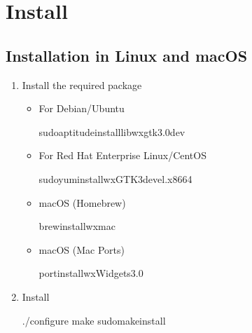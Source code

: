 \documentclass[letterpaper,10pt,pdftex,openany,english]{sphinxmanual}
\begin{document}
\sphinxstepscope


\chapter{Install}
\label{\detokenize{install:install}}\label{\detokenize{install::doc}}

\section{Installation in Linux and macOS}
\label{\detokenize{install:installation-in-linux-and-macos}}\begin{enumerate}
%
\item {} 
\sphinxAtStartPar
Install the required package
\begin{itemize}
\item {} 
\sphinxAtStartPar
For Debian/Ubuntu

\begin{sphinxVerbatim}[commandchars=\\\{\}]
\PYGZdl{}sudoaptitudeinstalllibwxgtk3.0\PYGZhy{}dev
\end{sphinxVerbatim}

\item {} 
\sphinxAtStartPar
For Red Hat Enterprise Linux/CentOS

\begin{sphinxVerbatim}[commandchars=\\\{\}]
\PYGZdl{}sudoyuminstallwxGTK3\PYGZhy{}devel.x86\PYGZus{}64
\end{sphinxVerbatim}

\item {} 
\sphinxAtStartPar
macOS (Homebrew)

\begin{sphinxVerbatim}[commandchars=\\\{\}]
\PYGZdl{}brewinstallwxmac
\end{sphinxVerbatim}

\item {} 
\sphinxAtStartPar
macOS (Mac Ports)

\begin{sphinxVerbatim}[commandchars=\\\{\}]
\PYGZdl{}portinstallwxWidgets\PYGZhy{}3.0
\end{sphinxVerbatim}

\end{itemize}

\item {} 
\sphinxAtStartPar
Install

\begin{sphinxVerbatim}[commandchars=\\\{\}]
\PYGZdl{}./configure
\PYGZdl{}make
\PYGZdl{}sudomakeinstall
\end{sphinxVerbatim}

\end{enumerate}
\end{document}
